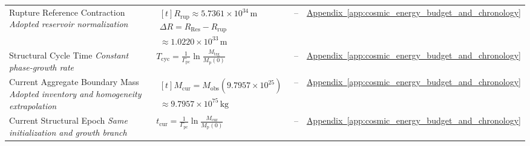 \begin{longtable}{@{} p{4.5cm} p{6cm} c p{4cm} @{}}
{\raggedright Rupture Reference Contraction \newline \textit{Adopted reservoir normalization}\par} & {\raggedright $\begin{gathered}[t]R_{\mathrm{rup}}\approx5.7361\times10^{34}\,\mathrm m \\ \Delta R=R_{\mathrm{Res}}-R_{\mathrm{rup}} \\ \approx1.0220\times10^{33}\,\mathrm m\end{gathered}$\par} & -- & {\raggedright \hyperref[app:cosmic_energy_budget_and_chronology]{Appendix~\ref*{app:cosmic_energy_budget_and_chronology}}\par} \\

{\raggedright Structural Cycle Time \newline \textit{Constant phase-growth rate}\par} & {\raggedright $T_{\mathrm{cyc}}=\frac1{\Gamma_{\mathrm{pc}}}\ln\!\frac{M_{\mathrm{trg}}}{M_{\mathrm p}(0)}$\par} & -- & {\raggedright \hyperref[app:cosmic_energy_budget_and_chronology]{Appendix~\ref*{app:cosmic_energy_budget_and_chronology}}\par} \\

{\raggedright Current Aggregate Boundary Mass \newline \textit{Adopted inventory and homogeneity extrapolation}\par} & {\raggedright $\begin{gathered}[t]M_{\mathrm{cur}}=M_{\mathrm{obs}}(9.7957\times10^{25}) \\ \approx9.7957\times10^{75}\,\mathrm{kg}\end{gathered}$\par} & -- & {\raggedright \hyperref[app:cosmic_energy_budget_and_chronology]{Appendix~\ref*{app:cosmic_energy_budget_and_chronology}}\par} \\

{\raggedright Current Structural Epoch \newline \textit{Same initialization and growth branch}\par} & {\raggedright $t_{\mathrm{cur}}=\frac1{\Gamma_{\mathrm{pc}}}\ln\!\frac{M_{\mathrm{cur}}}{M_{\mathrm p}(0)}$\par} & -- & {\raggedright \hyperref[app:cosmic_energy_budget_and_chronology]{Appendix~\ref*{app:cosmic_energy_budget_and_chronology}}\par} \\


\end{longtable}
